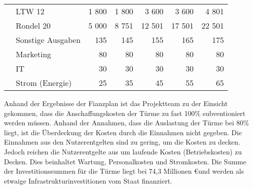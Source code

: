 \begin{table}[H]
\begin{tabular}{llrrrrr}
                                                                                 & LTW 12                      & 1 800         & 1 800         & 3 600         & 3 600         & 4 801  \\
                                                                                 & Rondel 20                   & 5 000         & 8 751         & 12 501        & 17 501        & 22 501 \\
    \midrule
                                                                                 & Sonstige Ausgaben           & 135           & 145           & 155           & 165           & 175    \\
                                                                                 & Marketing                   & 80            & 80            & 80            & 80            & 80     \\
                                                                                 & IT                          & 30            & 30            & 30            & 30            & 30     \\
                                                                                 & Strom (Energie)             & 25            & 35            & 45            & 55            & 65     \\
    \bottomrule
  \end{tabular}
\end{table}

Anhand der Ergebnisse der Fianzplan ist das Projektteam zu der Einsicht gekommen, dass die Anschaffungskosten der Türme zu fast 100\% subventioniert werden müssen. Anhand der Annahmen, dass die Auslastung der Türme bei 80\% liegt, ist die Überdeckung der Kosten durch die Einnahmen nicht gegeben. Die Einnahmen aus den Nutzerentgelten sind zu gering, um die Kosten zu decken. Jedoch reichen die Nutzerentgelte aus um laufende Kosten (Betriebskosten) zu Decken. Dies beinhaltet Wartung, Personalkosten und Stromkosten. Die Summe der Investitionssummen für die Türme liegt bei 74,3 Millionen \euro und werden als etwaige Infrastrukturinvestitionen vom Staat finanziert.
